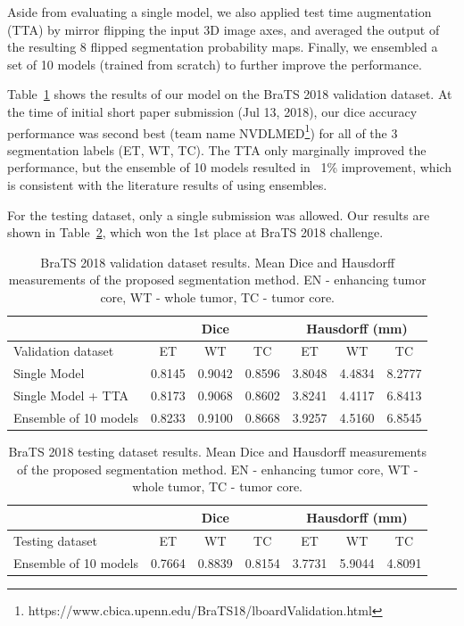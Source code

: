 \documentclass[runningheads]{llncs}
\begin{document}
  Aside from evaluating a single model,  we also applied test time augmentation (TTA) by mirror flipping the input 3D image axes, and averaged the output of the resulting 8 flipped segmentation probability maps. Finally, we ensembled a set of 10 models (trained from scratch) to further improve the performance.

 
 Table~\ref{tab:valid} shows the results of our model on the BraTS 2018 validation dataset. At the time of initial short paper submission (Jul 13, 2018), our dice accuracy performance was second best (team name  NVDLMED\footnote{https://www.cbica.upenn.edu/BraTS18/lboardValidation.html}) for all of the 3 segmentation labels  (ET, WT, TC). 
 The TTA only marginally improved the performance, but the ensemble of 10 models resulted in ~1\% improvement, which is consistent with the literature results of using ensembles. 
 
 For the testing dataset, only a single submission was allowed. Our results are shown in  Table~\ref{tab:testresults}, which won the 1st place at BraTS 2018 challenge. 

 
\begin{table}
	\centering
	\caption{BraTS 2018 validation dataset results. Mean Dice and Hausdorff measurements of the proposed segmentation method. EN - enhancing tumor core, WT - whole tumor, TC - tumor core.}
	\label{tab:valid}
	\begin{tabular}{l|c|c|c|c|c|c}
		\hline
		& \multicolumn{3}{c|}{Dice} & \multicolumn{3}{c}{Hausdorff (mm)}  \\ \hline
		Validation dataset & ET & WT & TC & ET & WT & TC \\ \hline
		Single Model & 0.8145 & 0.9042 & 0.8596 & 3.8048 & 4.4834 & 8.2777 \\
		Single Model + TTA & 0.8173 & 0.9068 & 0.8602 & 3.8241 & 4.4117 & 6.8413 \\
		Ensemble of 10 models  & 0.8233 & 0.9100 & 0.8668 & 3.9257 & 4.5160 & 6.8545 \\
		\hline
	\end{tabular}
\end{table}
 

\begin{table}
	\centering
	\caption{BraTS 2018 testing dataset results. Mean Dice and Hausdorff measurements of the proposed segmentation method.  EN - enhancing tumor core, WT - whole tumor, TC - tumor core.}
	\label{tab:testresults}
	\begin{tabular}{l|c|c|c|c|c|c}
		\hline
		& \multicolumn{3}{c|}{Dice} & \multicolumn{3}{c}{Hausdorff (mm)}  \\ \hline
		Testing dataset  & ET & WT & TC & ET & WT & TC \\ \hline
		Ensemble of 10 models & 0.7664 & 0.8839 & 0.8154 & 3.7731 & 5.9044 & 4.8091 \\

		\hline
	\end{tabular}

\end{table}
\end{document}
